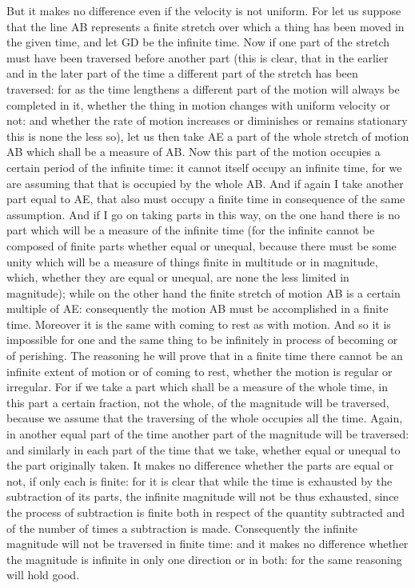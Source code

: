 But it makes no difference even if the velocity is not uniform. For
let us suppose that the line AB represents a finite stretch over which
a thing has been moved in the given time, and let GD be the infinite
time. Now if one part of the stretch must have been traversed before
another part (this is clear, that in the earlier and in the later
part of the time a different part of the stretch has been traversed:
for as the time lengthens a different part of the motion will always
be completed in it, whether the thing in motion changes with uniform
velocity or not: and whether the rate of motion increases or diminishes
or remains stationary this is none the less so), let us then take
AE a part of the whole stretch of motion AB which shall be a measure
of AB. Now this part of the motion occupies a certain period of the
infinite time: it cannot itself occupy an infinite time, for we are
assuming that that is occupied by the whole AB. And if again I take
another part equal to AE, that also must occupy a finite time in consequence
of the same assumption. And if I go on taking parts in this way, on
the one hand there is no part which will be a measure of the infinite
time (for the infinite cannot be composed of finite parts whether
equal or unequal, because there must be some unity which will be a
measure of things finite in multitude or in magnitude, which, whether
they are equal or unequal, are none the less limited in magnitude);
while on the other hand the finite stretch of motion AB is a certain
multiple of AE: consequently the motion AB must be accomplished in
a finite time. Moreover it is the same with coming to rest as with
motion. And so it is impossible for one and the same thing to be infinitely
in process of becoming or of perishing. The reasoning he will prove
that in a finite time there cannot be an infinite extent of motion
or of coming to rest, whether the motion is regular or irregular.
For if we take a part which shall be a measure of the whole time,
in this part a certain fraction, not the whole, of the magnitude will
be traversed, because we assume that the traversing of the whole occupies
all the time. Again, in another equal part of the time another part
of the magnitude will be traversed: and similarly in each part of
the time that we take, whether equal or unequal to the part originally
taken. It makes no difference whether the parts are equal or not,
if only each is finite: for it is clear that while the time is exhausted
by the subtraction of its parts, the infinite magnitude will not be
thus exhausted, since the process of subtraction is finite both in
respect of the quantity subtracted and of the number of times a subtraction
is made. Consequently the infinite magnitude will not be traversed
in finite time: and it makes no difference whether the magnitude is
infinite in only one direction or in both: for the same reasoning
will hold good. 

